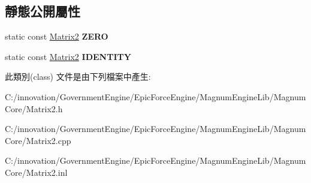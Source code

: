 \subsection*{靜態公開屬性}
\begin{DoxyCompactItemize}
\item 
static const \hyperlink{class_i_dream_sky_1_1_matrix2}{Matrix2} {\bfseries Z\+E\+RO}\hypertarget{class_i_dream_sky_1_1_matrix2_ac1422e38a1b3ae4c6611a4c1a1c3b1ca}{}\label{class_i_dream_sky_1_1_matrix2_ac1422e38a1b3ae4c6611a4c1a1c3b1ca}

\item 
static const \hyperlink{class_i_dream_sky_1_1_matrix2}{Matrix2} {\bfseries I\+D\+E\+N\+T\+I\+TY}\hypertarget{class_i_dream_sky_1_1_matrix2_a4e3407f5687dae6328e4d41ebe7e7414}{}\label{class_i_dream_sky_1_1_matrix2_a4e3407f5687dae6328e4d41ebe7e7414}

\end{DoxyCompactItemize}


此類別(class) 文件是由下列檔案中產生\+:\begin{DoxyCompactItemize}
\item 
C\+:/innovation/\+Government\+Engine/\+Epic\+Force\+Engine/\+Magnum\+Engine\+Lib/\+Magnum\+Core/Matrix2.\+h\item 
C\+:/innovation/\+Government\+Engine/\+Epic\+Force\+Engine/\+Magnum\+Engine\+Lib/\+Magnum\+Core/Matrix2.\+cpp\item 
C\+:/innovation/\+Government\+Engine/\+Epic\+Force\+Engine/\+Magnum\+Engine\+Lib/\+Magnum\+Core/Matrix2.\+inl\end{DoxyCompactItemize}
